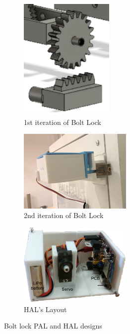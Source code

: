 \documentclass[onecolumn]{IEEEtran}
\begin{document}
        \begin{figure}
            \begin{subfigure}{.3\textwidth}
                \centering
                \includegraphics[width=0.5\textwidth]{images/Boltlock1.png}
                \caption{1st iteration of Bolt Lock}
            \end{subfigure}\hfill
            \begin{subfigure}{.3\textwidth}
                \centering
                \includegraphics[width=0.6\textwidth]{images/Boltlock2.jpg}
                \caption{2nd iteration of Bolt Lock}
            \end{subfigure}\hfill
        \begin{subfigure}{.3\textwidth}
                \centering
                \includegraphics[width=0.6\textwidth]{images/HAL.png}
                \caption{HAL's Layout}
                \label{fig:hal}
            \end{subfigure}\hfill
        \caption{Bolt lock PAL and HAL designs}
        \end{figure}
        
\end{document}
